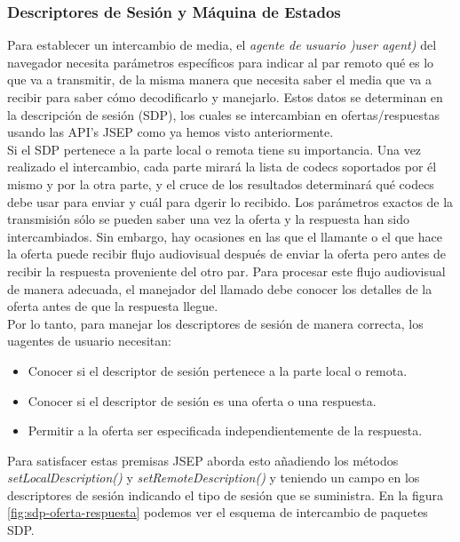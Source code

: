 \subsubsection{Descriptores de Sesión y Máquina de Estados}

Para establecer un intercambio de media, el \textit{agente de usuario )user agent)} del navegador necesita parámetros específicos para indicar al par remoto qué es lo que va a transmitir, de la misma manera que necesita saber el media que va a recibir para saber cómo decodificarlo y manejarlo. Estos datos se determinan en la descripción de sesión (SDP), los cuales se intercambian en ofertas/respuestas usando las API's JSEP como ya hemos visto anteriormente.\\

Si el SDP pertenece a la parte local o remota tiene su importancia. Una vez realizado el intercambio, cada parte mirará la lista de codecs soportados por él mismo y por la otra parte, y el cruce de los resultados determinará qué codecs debe usar para enviar y cuál para dgerir lo recibido. Los parámetros exactos de la transmisión sólo se pueden saber una vez la oferta y la respuesta han sido intercambiados. Sin embargo, hay ocasiones en las que el llamante o el que hace la oferta puede recibir flujo audiovisual después de enviar la oferta pero antes de recibir la respuesta proveniente del otro par. Para procesar este flujo audiovisual de manera adecuada, el manejador del llamado debe conocer los detalles de la oferta antes de que la respuesta llegue.\\

Por lo tanto, para manejar los descriptores de sesión de manera correcta, los uagentes de usuario necesitan:

\begin{itemize}
\item Conocer si el descriptor de sesión pertenece a la parte local o remota.
\item Conocer si el descriptor de sesión es una oferta o una respuesta.
\item Permitir a la oferta ser especificada independientemente de la respuesta.
\end{itemize}

Para satisfacer estas premisas JSEP aborda esto añadiendo los métodos \emph{setLocalDescription()} y \emph{setRemoteDescription()} y teniendo un campo en los descriptores de sesión indicando el tipo de sesión que se suministra. En la figura \ref{fig:sdp-oferta-respuesta} podemos ver el esquema de intercambio de paquetes SDP.\\


